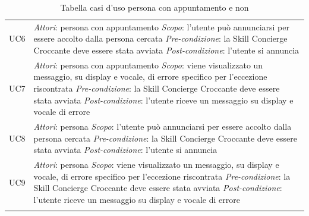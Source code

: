 \begin{center}
\begin{longtable}{  p{2.5cm} p{9.8cm} }
		UC6 &  \textit{Attori}: persona con appuntamento \newline \textit{Scopo}: l'utente può annunciarsi per essere accolto dalla persona cercata \newline \textit{Pre-condizione}: la Skill Concierge Croccante deve essere stata avviata \newline \textit{Post-condizione}: l'utente si annuncia \\
		
		UC7 &  \textit{Attori}: persona con appuntamento \newline \textit{Scopo}: viene visualizzato un messaggio, su display e vocale, di errore specifico per l'eccezione riscontrata \newline \textit{Pre-condizione}: la Skill Concierge Croccante deve essere stata avviata \newline \textit{Post-condizione}: l'utente riceve un messaggio su display e vocale di errore\\
		
		UC8 &  \textit{Attori}: persona \newline \textit{Scopo}: l'utente può annunciarsi per essere accolto dalla persona cercata \newline \textit{Pre-condizione}: la Skill Concierge Croccante deve essere stata avviata \newline \textit{Post-condizione}: l'utente si annuncia \\
		
		UC9 &  \textit{Attori}: persona \newline \textit{Scopo}: viene visualizzato un messaggio, su display e vocale, di errore specifico per l'eccezione riscontrata \newline \textit{Pre-condizione}: la Skill Concierge Croccante deve essere stata avviata \newline \textit{Post-condizione}: l'utente riceve un messaggio su display e vocale di errore\\
		
		\rowcolor{white}
		\caption{\label{tab:UC_persona}Tabella casi d'uso persona con appuntamento e non}
	\end{longtable}
\end{center}
